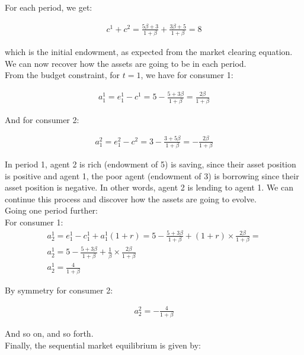 \documentclass{article}
\begin{document}
For each period, we get:

\begin{gather*}
    c^1+c^2=\frac{5\beta+3}{1+\beta}+\frac{3\beta+5}{1+\beta}=8
\end{gather*}

which is the initial endowment, as expected from the market clearing equation.\\

We can now recover how the assets are going to be in each period.\\

From the budget constraint, for $t=1$, we have for consumer 1:

\begin{gather*}
    a_1^1=e_1^1-c^1=5-\frac{5+3\beta}{1+\beta}=\frac{2\beta}{1+\beta}
\end{gather*}

And for consumer 2:

\begin{gather*}
    a_1^2=e_1^2-c^2=3-\frac{3+5\beta}{1+\beta}=-\frac{2\beta}{1+\beta}
\end{gather*}


In period 1, agent 2 is rich (endowment of 5)  is saving, since their asset position is positive and agent 1, the poor agent (endowment of 3) is borrowing since their asset position is negative. In other words, agent 2 is lending to agent 1. We can continue this process and discover how the assets are going to evolve.\\

Going one period further:\\

For consumer 1:
\begin{gather*}
    a^1_2=e_1^1-c_1^1+a^1_1(1+r)=5-\frac{5+3\beta}{1+\beta}+(1+r)\times\frac{2\beta}{1+\beta}=\\
    a^1_2=5-\frac{5+3\beta}{1+\beta}+\frac{1}{\beta}\times\frac{2\beta}{1+\beta}\\
    a^1_2=\frac{4}{1+\beta}
\end{gather*}

By symmetry for consumer 2:

\begin{gather*}
    a^2_2=-\frac{4}{1+\beta}
\end{gather*}

And so on, and so forth.\\

Finally, the sequential market equilibrium is given by:
\end{document}
